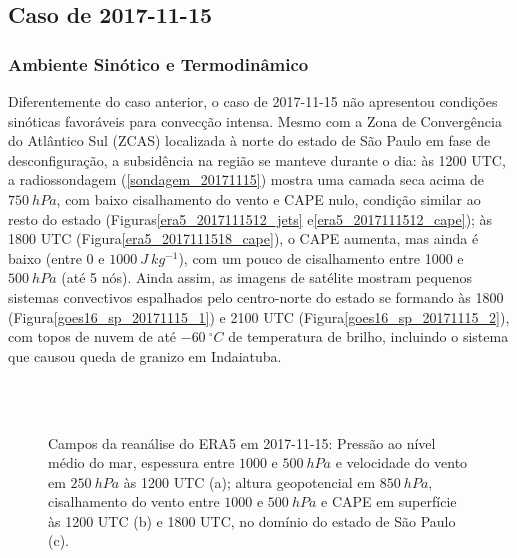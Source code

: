 \newpage

\subsection{Caso de 2017-11-15}

\subsubsection{Ambiente Sinótico e Termodinâmico}\label{sinotica_20171115}

Diferentemente do caso anterior, o caso de 2017-11-15 não apresentou condições sinóticas favoráveis para convecção intensa. Mesmo com a Zona de Convergência do Atlântico Sul (ZCAS) localizada à norte do estado de São Paulo em fase de desconfiguração, a subsidência na região se manteve durante o dia: às 1200 UTC, a radiossondagem (\autoref{sondagem_20171115}) mostra uma camada seca acima de $750\:hPa$, com baixo cisalhamento do vento e CAPE nulo, condição similar ao resto do estado (Figuras\autoref{era5_2017111512_jets} e\autoref{era5_2017111512_cape}); às 1800 UTC (Figura\autoref{era5_2017111518_cape}), o CAPE aumenta, mas ainda é baixo (entre 0 e $1000\:J\:kg^{-1}$), com um pouco de cisalhamento entre 1000 e $500\:hPa$ (até 5 nós). Ainda assim, as imagens de satélite mostram pequenos sistemas convectivos espalhados pelo centro-norte do estado se formando às 1800 (Figura\autoref{goes16_sp_20171115_1}) e 2100 UTC (Figura\autoref{goes16_sp_20171115_2}), com topos de nuvem de até $-60\:^{\circ}C$ de temperatura de brilho, incluindo o sistema que causou queda de granizo em Indaiatuba.

\begin{figure}[htb]
	\begin{center}
		\caption{Campos da reanálise do ERA5 em 2017-11-15: Pressão ao nível médio do mar, espessura entre $1000$ e $500\:hPa$ e velocidade do vento em $250\:hPa$ às 1200 UTC (a); altura geopotencial em $850\:hPa$, cisalhamento do vento entre $1000$ e $500\:hPa$ e CAPE em superfície às 1200 UTC (b) e 1800 UTC, no domínio do estado de São Paulo (c).} 
		\label{era5_20171115_main}
		 \\
		 \\
	\end{center}
\end{figure}

